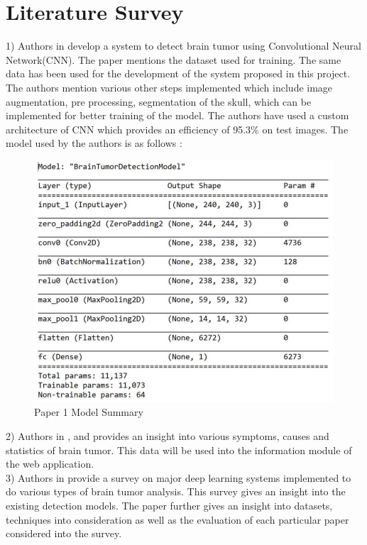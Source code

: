 \chapter{Literature Survey}

1) Authors in \cite{ref1} develop a system to detect brain tumor using Convolutional Neural Network(CNN). The paper mentions the dataset used for training. The same data has been used for the development of the system proposed in this project. The authors mention various other steps implemented which include image augmentation, pre processing, segmentation of the skull, which can be implemented for better training of the model. The authors have used a custom architecture of CNN which provides an efficiency of 95.3\% on test images. The model used by the authors is as follows : 
\begin{figure}[H]
\includegraphics[scale=1]{Photos/paper1_model.PNG}
\caption{Paper 1 Model Summary} \label{fig:ishan}
\end{figure}

2) Authors in \cite{ref2} , \cite{ref3} and \cite{ref5} provides an insight into various symptoms, causes and statistics of brain tumor. This data will be used into the information module of the web application.\\ 

3) Authors in \cite{ref4} provide a survey on major deep learning systems implemented to do various types of brain tumor analysis. This survey gives an insight into the existing detection models. The paper further gives an insight into datasets, techniques into consideration as well as the evaluation of each particular paper considered into the survey.\\


